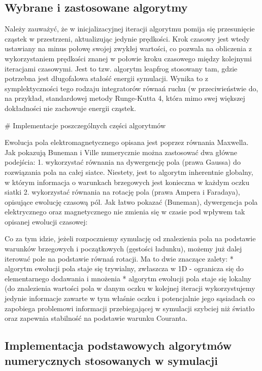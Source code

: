 \subsection{Wybrane i zastosowane algorytmy}
Należy zauważyć, że w inicjalizacyjnej iteracji algorytmu pomija się przesunięcie cząstek w przestrzeni, aktualizując jedynie
prędkości. Krok czasowy jest wtedy ustawiany na minus połowę swojej zwykłej wartości, co pozwala na obliczenia
z wykorzystaniem prędkości znanej w połowie kroku czasowego między kolejnymi iteracjami czasowymi. Jest to tzw. algorytm
leapfrog %
stosowany tam, gdzie potrzebna jest długofalowa stałość energii symulacji. Wynika to z symplektyczności %
tego rodzaju integratorów równań ruchu (w przeciwieństwie do, na przykład, standardowej metody Runge-Kutta 4, która
mimo swej większej dokładności nie zachowuje energii cząstek.

# Implementacje poszczególnych części algorytmów

Ewolucja pola elektromagnetycznego opisana jest poprzez równania Maxwella. Jak pokazują Buneman i Ville %
numerycznie można zastosować dwa główne podejścia: %
1. wykorzystać równania na dywergencję pola (prawa Gaussa) do rozwiązania pola na całej siatce. Niestety, jest to
algorytm inherentnie globalny, w którym informacja o warunkach brzegowych jest konieczna w każdym oczku siatki
2. wykorzystać równania na rotację pola (prawa Ampera i Faradaya), opisujące ewolucję czasową pól. Jak łatwo pokazać (Buneman),
dywergencja pola elektrycznego oraz magnetycznego nie zmienia się w czasie pod wpływem tak opisanej ewolucji czasowej:

Co za tym idzie, jeżeli rozpoczniemy symulację od znalezienia pola na podstawie warunków brzegowych i początkowych (gęstości
ładunku), możemy już dalej iterować pole na podstawie równań rotacji. Ma to dwie znaczące zalety:
* algorytm ewolucji pola staje się trywialny, zwłaszcza w 1D - ogranicza się do elementarnego dodawania i mnożenia %
* algorytm ewolucji pola staje się lokalny (do znalezienia wartości pola w danym oczku w kolejnej iteracji wykorzystujemy
jedynie informacje zawarte w tym właśnie oczku i potencjalnie jego sąsiadach %
co zapobiega problemowi informacji przebiegającej w symulacji szybciej niż światło oraz zapewnia stabilność na podstawie
warunku Couranta.
\subsection{Implementacja podstawowych algorytmów numerycznych stosowanych w symulacji}
